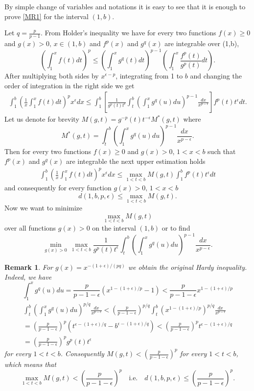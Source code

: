 \documentclass[10pt,a4paper]{amsart}
\newtheorem{remark}[theorem]{Remark}
\numberwithin{equation}{section}
\begin{document}
By simple change of variables and notations it is easy to see that it is enough to prove \eqref{MR1} for the interval $(1,b)$.

Let $q=\frac{p}{p-1}$. From Holder's inequality we have for every two  functions $f(x)\geq0$ and $g(x)> 0, \,x\in(1,b)$ and $f^p(x)$
 and $g^q(x)$ are integrable over (1,b), 
\[
\left(\int_1^x f(t)dt \right)^p   \le\left(\int_1^x g^q(t)dt  \right)^{p-1}\left(\int_1^x \frac{f^p(t)}{g^p(t)}dt  \right).
\]
After multiplying both sides by $x^{\epsilon-p}$, integrating from 1 to $b$ and changing the order of integration in the right side 
we get
\begin{align*}
\int_1^b\left(\frac{1}{x}\int_1^x f(t)dt \right)^p x^\epsilon dx   \le 
\int_1^b\left[\frac{1}{g^p(t)t^\epsilon}\int_t^b\left(\int_1^x g^q(u)du \right)^{p-1}\frac{dx}{x^{p-\epsilon}}  \right]f^p(t)t^\epsilon dt.
\end{align*}
Let us denote for brevity $M(g,t)=g^{-p}(t)t^{-\epsilon}M^*(g,t)$ where
\[
M^*(g,t)=\int_t^b\left(\int_1^x g^q(u)du \right)^{p-1}\frac{dx}{x^{p-\epsilon}}.
\]
Then for every two functions $f(x)\geq 0$ and $g(x)> 0$, $1<x<b$ such that $f^p(x)$ and $g^q(x)$ are integrable the next upper estimation holds
\begin{align*}
\int_1^b\left(\frac{1}{x}\int_1^x f(t)dt \right)^px^\epsilon dx   \le 
\max_{1< t< b}M(g,t)  \int_1^b f^p(t) t^\epsilon dt
\end{align*}
and consequently for every function $g(x)> 0,\,1<x<b$
\[
d(1,b,p,\epsilon)\le \max_{1< t< b}M(g,t). 
\]
Now we want to minimize 
\[
\max_{1< t< b}M(g,t)
\]
 over all functions  $g(x)> 0$ on the interval $(1,b)$ or to find 
\[
\min_{g(x)> 0}\,\max_{1< t< b}\frac{1}{g^p(t)t^\epsilon}\int_t^b\left(\int_1^x g^q(u)du \right)^{p-1}\frac{dx}{x^{p-\epsilon}}.
\]
\begin{remark}
For $g(x)=x^{-(1+\epsilon)/(pq)}$ we obtain the original Hardy inequality. Indeed, we have
\[
\int_1^x g^q(u)du=\frac{p}{p-1-\epsilon}  \left(x^{1-(1+\epsilon)/p}-1\right)<\frac{p}{p-1-\epsilon}x^{1-(1+\epsilon)/p}
\]
\begin{align*}
\int_t^b\left(\int_1^x g^q(u)du \right)^{p/q}\frac{dx}{x^{p-\epsilon}}
<\left(\frac{p}{p-1-\epsilon}\right)^{p/q}
\int_t^b \left(x^{1-(1+\epsilon)/p} \right)^{p/q}\frac{dx}{x^{p-\epsilon}}\\
=\left(\frac{p}{p-1-\epsilon}\right)^{p}\left(t^{\epsilon-(1+\epsilon)/q}-b^{\epsilon-(1+\epsilon)/q} \right)
<\left(\frac{p}{p-1-\epsilon}\right)^{p}t^{\epsilon-(1+\epsilon)/q}\\
=\left(\frac{p}{p-1-\epsilon}\right)^{p} g^p(t)t^{\epsilon}
 \end{align*}
for every $1< t< b$. Consequently $M(g,t)<\left(\frac{p}{p-1-\epsilon}\right)^{p}$ for every $1< t< b$, which means that
\[
\max_{1< t< b}M(g,t)<\left(\frac{p}{p-1-\epsilon}\right)^{p} \quad\mbox{i.e.}\quad d(1,b,p,\epsilon)\le \left(\frac{p}{p-1-\epsilon}\right)^{p} .
\]
\end{remark}
\end{document}
